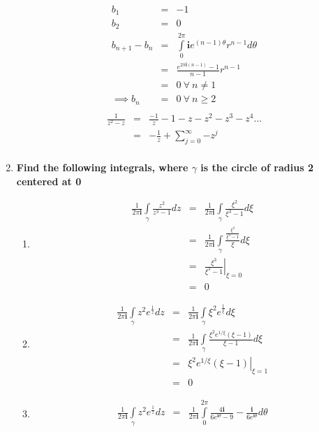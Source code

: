 \documentclass{article}%
\newcommand\I{\textbf{i}}
\begin{document}
\begin{enumerate}
\begin{eqnarray*}
        b_1 &=& -1 \\
        b_2 &=& 0 \\
        b_{n+1} - b_n &=& \int\limits_0^{2\pi}{\I e^{(n-1)\theta} r^{n-1} d\theta} \\
                      &=& \frac{e^{2\pi\I(n-1)}-1}{n-1}r^{n-1} \\
                      &=& 0 ~\forall ~n\neq 1 \\
        \implies b_n &=& 0 ~\forall~n \geq 2 \\
    \end{eqnarray*}
    \begin{eqnarray*}
        \frac{1}{z^2-z} &=& \frac{-1}{z} -1 -z-z^2-z^3-z^4 ... \\
            &=& -\frac{1}{z} + \sum\limits_{j=0}^{\infty}{-z^{j}} \\
    \end{eqnarray*}
    \item %
    \textbf{Find the following integrals, where $\gamma$ is the circle of radius 2 centered at 0}
    \begin{enumerate}[label=\alph*)]
        \item %
        \begin{eqnarray*}
            \frac{1}{2\pi\I}\int\limits_{\gamma}{\frac{z^2}{z^3-1}dz} &=& \frac{1}{2\pi\I}\int\limits_{\gamma}{\frac{\xi^2}{\xi^3-1}d\xi} \\
                &=& \frac{1}{2\pi\I}\int\limits_{\gamma}{\frac{\frac{\xi^3}{\xi^3-1}}{\xi}d\xi} \\
                &=& \left.\frac{\xi^3}{\xi^3-1}\right|_{\xi=0} \\
                &=& 0
        \end{eqnarray*}
        \item %
        \begin{eqnarray*}
            \frac{1}{2\pi\I}\int\limits_{\gamma}{z^2e^{\frac{1}{z}}dz} &=& \frac{1}{2\pi\I}\int\limits_{\gamma}{\xi^2e^{\frac{1}{\xi}}d\xi} \\
                &=& \frac{1}{2\pi\I}\int\limits_{\gamma}{\frac{\xi^2e^{1/\xi}(\xi-1)}{\xi-1}d\xi} \\
                &=& \left.\xi^2e^{1/\xi}(\xi-1)\right|_{\xi=1} \\
                &=& 0
        \end{eqnarray*}
        \item %
        \begin{eqnarray*}
            \frac{1}{2\pi\I}\int\limits_{\gamma}{z^2e^{\frac{1}{z}}dz} &=& \frac{1}{2\pi\I}\int\limits_{0}^{2\pi}{\frac{4\I}{6e^{\I\theta}-9}-\frac{\I}{6e^{\I\theta}} d\theta} \\

\end{eqnarray*}
\end{enumerate}
\end{enumerate}
\end{document}
